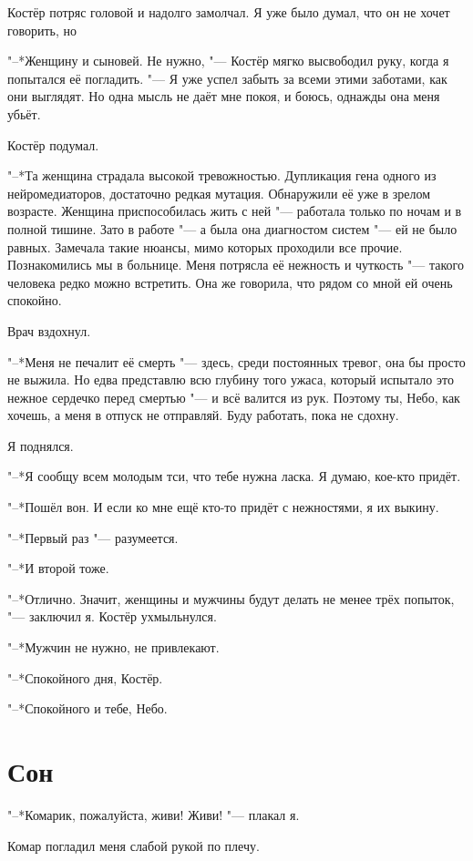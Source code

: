 \documentclass[a4paper,10pt]{book}
\newcommand{\ldotst}{\so{...}\xspace}
\begin{document}
Костёр потряс головой и надолго замолчал. Я уже было думал, что он не хочет 
говорить, но\ldotst

"--*Женщину и сыновей. Не нужно, "--- Костёр мягко высвободил руку, когда я 
попытался её погладить. "--- Я уже успел забыть за всеми этими заботами, как 
они выглядят. Но одна мысль не даёт мне покоя, и боюсь, однажды она меня убьёт. 

Костёр подумал.

"--*Та женщина страдала высокой тревожностью. Дупликация гена одного из 
нейромедиаторов, достаточно редкая мутация. Обнаружили её уже в зрелом 
возрасте. Женщина приспособилась жить с ней "--- работала только по ночам и в 
полной тишине. Зато в работе "--- а была она диагностом систем "--- ей не было 
равных. Замечала такие нюансы, мимо которых проходили все прочие. Познакомились 
мы в больнице. Меня потрясла её нежность и чуткость "--- такого человека редко 
можно встретить. Она же говорила, что рядом со мной ей очень спокойно.

Врач вздохнул.

"--*Меня не печалит её смерть "--- здесь, среди постоянных тревог, она бы 
просто не выжила. Но едва представлю всю глубину того ужаса, который испытало 
это нежное сердечко перед смертью "--- и всё валится из рук. Поэтому ты, Небо, 
как хочешь, а меня в отпуск не отправляй. Буду работать, пока не сдохну.

Я поднялся.

"--*Я сообщу всем молодым тси, что тебе нужна ласка. Я думаю, кое-кто придёт.

"--*Пошёл вон. И если ко мне ещё кто-то придёт с нежностями, я их выкину.

"--*Первый раз "--- разумеется.

"--*И второй тоже.

"--*Отлично. Значит, женщины и мужчины будут делать не менее трёх попыток, "--- 
заключил я. Костёр ухмыльнулся.

"--*Мужчин не нужно, не привлекают.

"--*Спокойного дня, Костёр.

"--*Спокойного и тебе, Небо.
 
\section{Сон}

"--*Комарик, пожалуйста, живи! Живи! "--- плакал я.

Комар погладил меня слабой рукой по плечу.
\end{document}
